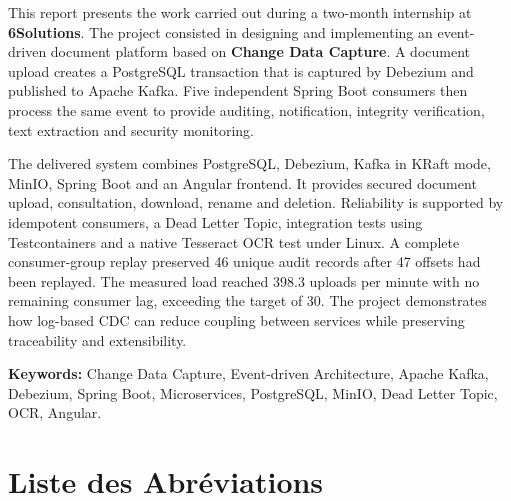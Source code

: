 \documentclass[12pt,a4paper,openany]{report}
\begin{document}
    \noindent This report presents the work carried out during a two-month internship at \textbf{6Solutions}. The project consisted in designing and implementing an event-driven document platform based on \textbf{Change Data Capture}. A document upload creates a PostgreSQL transaction that is captured by Debezium and published to Apache Kafka. Five independent Spring Boot consumers then process the same event to provide auditing, notification, integrity verification, text extraction and security monitoring.

    The delivered system combines PostgreSQL, Debezium, Kafka in KRaft mode, MinIO, Spring Boot and an Angular frontend. It provides secured document upload, consultation, download, rename and deletion. Reliability is supported by idempotent consumers, a Dead Letter Topic, integration tests using Testcontainers and a native Tesseract OCR test under Linux. A complete consumer-group replay preserved 46 unique audit records after 47 offsets had been replayed. The measured load reached 398.3 uploads per minute with no remaining consumer lag, exceeding the target of 30. The project demonstrates how log-based CDC can reduce coupling between services while preserving traceability and extensibility.

    \bigskip
    \noindent\textbf{Keywords:} Change Data Capture, Event-driven Architecture, Apache Kafka, Debezium, Spring Boot, Microservices, PostgreSQL, MinIO, Dead Letter Topic, OCR, Angular.

    \newpage
    \listoffigures
    \newpage
    \listoftables

    \newpage
    \chapter*{Liste des Abr\'eviations}
\end{document}
